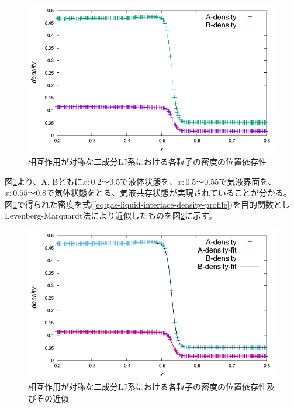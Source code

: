 \documentclass[titlepage]{jsreport}
\begin{document}
\begin{figure}[htbp]
    \begin{center}
        \includegraphics[width=14cm]{fig/lan140493-lbn561971-ran3930-rbn15722/lan140493-lbn561971-ran3930-rbn15722.pdf}
    \end{center}
    \caption{相互作用が対称な二成分LJ系における各粒子の密度の位置依存性}
    \label{fig:lan140493-lbn561971-ran3930-rbn15722}
\end{figure}

\newpage
図\ref{fig:lan140493-lbn561971-ran3930-rbn15722}より、A, Bともに$x:0.2〜0.5$で液体状態を、$x:0.5〜0.55$で気液界面を、$x:0.55〜0.8$で気体状態をとる、気液共存状態が実現されていることが分かる。図\ref{fig:lan140493-lbn561971-ran3930-rbn15722}で得られた密度を式(\ref{eq:gas-liquid-interface-density-profile})を目的関数としLevenberg-Marquardt法により近似したものを図\ref{fig:lan140493-lbn561971-ran3930-rbn15722-fitting}に示す。

\begin{figure}[htbp]
    \begin{center}
        \includegraphics[width=14cm]{fig/lan140493-lbn561971-ran3930-rbn15722/lan140493-lbn561971-ran3930-rbn15722-fitting.pdf}
    \end{center}
    \caption{相互作用が対称な二成分LJ系における各粒子の密度の位置依存性及びその近似}
    \label{fig:lan140493-lbn561971-ran3930-rbn15722-fitting}
\end{figure}
\end{document}
